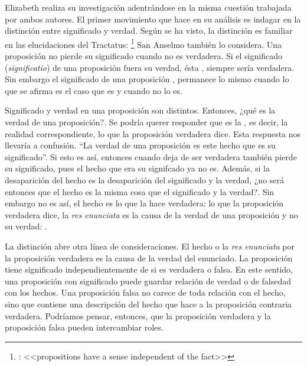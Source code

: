 Elizabeth realiza su investigación adentrándose en la misma cuestión trabajada
por ambos autores. El primer movimiento que hace en su análisis es indagar en la
distinción entre significado y verdad. Según se ha visto, la distinción es
familiar en las elucidaciones del Tractatus: 
\footnote{\cite[\S~4.061]{wittgenstein1922tractatus}: <<propositions have a
  sense independent of the fact>>} San Anselmo también lo considera. Una
proposición no pierde su significado cuando no es verdadera. Si el significado
(\emph{significatio}) de una proposición fuera su verdad, ésta
\autocite[492]{anselm1952obras:deveritate},
siempre sería verdadera. Sin embargo el significado de una proposición
\autocite[492]{anselm1952obras:deveritate}, permanece lo mismo cuando lo
que se afirma es el caso que es y cuando no lo es.

Significado y verdad en una proposición son distintos. Entonces, ¿qué es la
verdad de una proposición?. Se podría querer responder que es la
, es decir, la realidad correspondiente, lo que
la proposición verdadera dice. Esta respuesta nos llevaría a confusión. ``La
verdad de una proposición es este hecho que es su significado''. Si esto es así,
entonces cuando deja de ser verdadera también pierde su significado, pues el
hecho que era su signifcado ya no es. Además, si la desaparición del hecho es la
desaparición del significado y la verdad, ¿no será entonces que el hecho es la
misma cosa que el significado y la
verdad?\autocite[Cf.~][72]{anscombe2011plato:truth}. Sin embargo no es así, el
hecho es lo que la hace verdadera: lo que la proposición verdadera dice, la
\emph{res enunciata} es la causa de la verdad de una proposición y no su verdad:
\autocite[492]{anselm1952obras:deveritate}.

La distinción abre otra línea de consideraciones. El hecho o la \emph{res
  enunciata} por la proposición verdadera es la causa de la verdad del
enunciado. La proposición tiene significado independientemente de si es
verdadera o falsa. En este sentido, una proposición con significado puede
guardar relación de verdad o de falsedad con los hechos. Una proposición falsa
no carece de toda relación con el hecho, sino que contiene una descripción del
hecho que hace a la proposición contraria
verdadera\autocite[Cf.~][73]{anscombe2011plato:truth}. Podríamos pensar,
entonces, que la proposición verdadera y la proposición falsa pueden
intercambiar roles.

